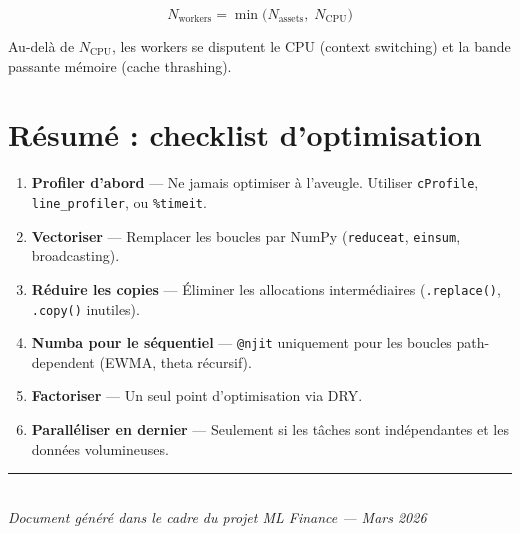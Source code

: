 \documentclass[11pt, a4paper]{article}
\begin{document}
\begin{equation}
    N_{\text{workers}} = \min\bigl(N_{\text{assets}},\; N_{\text{CPU}}\bigr)
\end{equation}

Au-del\`a de $N_{\text{CPU}}$, les workers se disputent le CPU (context switching)
et la bande passante m\'emoire (cache thrashing).


\section{R\'esum\'e : checklist d'optimisation}

\begin{keybox}
\begin{enumerate}[leftmargin=1.5cm]
    \item[\textbf{1.}] \textbf{Profiler d'abord} --- Ne jamais optimiser \`a l'aveugle.
        Utiliser \texttt{cProfile}, \texttt{line\_profiler}, ou \texttt{\%timeit}.
    \item[\textbf{2.}] \textbf{Vectoriser} --- Remplacer les boucles par NumPy
        (\texttt{reduceat}, \texttt{einsum}, broadcasting).
    \item[\textbf{3.}] \textbf{R\'eduire les copies} --- \'Eliminer les allocations
        interm\'ediaires (\texttt{.replace()}, \texttt{.copy()} inutiles).
    \item[\textbf{4.}] \textbf{Numba pour le s\'equentiel} --- \texttt{@njit} uniquement
        pour les boucles path-dependent (EWMA, theta r\'ecursif).
    \item[\textbf{5.}] \textbf{Factoriser} --- Un seul point d'optimisation via DRY.
    \item[\textbf{6.}] \textbf{Parall\'eliser en dernier} --- Seulement si les t\^aches
        sont ind\'ependantes et les donn\'ees volumineuses.
\end{enumerate}
\end{keybox}

\vfill
\begin{center}
\rule{0.5\textwidth}{0.4pt}\\[0.3cm]
{\small\textit{Document g\'en\'er\'e dans le cadre du projet ML Finance --- Mars 2026}}
\end{center}
\end{document}

